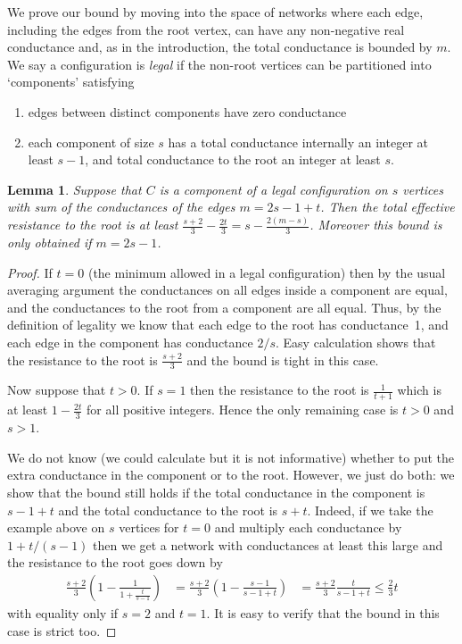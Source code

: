 \documentclass[11pt]{article}
\newtheorem{lemma}[theorem]{Lemma}
\theoremstyle{remark}
\begin{document}
We prove our bound by moving into the space of networks where each
edge, including the edges from the root vertex, can have any
non-negative real conductance and, as in the introduction, the total
conductance is bounded by $m$. We say a
configuration is \emph{legal} if the non-root vertices can be partitioned into
`components' satisfying
\begin{enumerate}
\item edges between distinct components have zero conductance
\item each component of size $s$ has a total conductance internally an
integer at least $s-1$, and total conductance to the root an integer
at least $s$.
\end{enumerate}
\begin{lemma}\label{l:qb-component}
  Suppose that $C$ is a component of a legal configuration on $s$ vertices
  with sum of the conductances of the edges $m=2s-1+t$. Then the total
  effective resistance to the root is at least
  $\frac{s+2}3-\frac{2t}{3}=s-\frac{2(m-s)}{3}$. Moreover this
  bound is only obtained if $m=2s-1$.
\end{lemma}
\begin{proof}
  If $t=0$ (the minimum allowed in a legal configuration) then by the
  usual averaging argument the conductances on all edges inside a
  component are equal, and the conductances to the root from a
  component are all equal. Thus, by the definition of legality we know
  that each edge to the root has conductance~1, and each edge in the
  component has conductance $2/s$. Easy calculation shows that the
  resistance to the root is $\frac{s+2}{3}$ and the bound is tight in
  this case.

  Now suppose that $t>0$.  If $s=1$ then the resistance to the root is
  $\frac{1}{t+1}$ which is at least $1-\frac{2t}{3}$ for all positive
  integers. Hence the only remaining case is $t>0$ and $s>1$. 

  We do not know (we could calculate but it is not informative)
  whether to put the extra conductance in the component or to the
  root. However, we just do both: we show that the bound still holds
  if the total conductance in the component is $s-1+t$ and the total
  conductance to the root is $s+t$. Indeed, if we take the example
  above on $s$ vertices for $t=0$ and multiply each conductance by
  $1+t/(s-1)$ then we get a network with conductances at least this
  large and the resistance to the root goes down by
  \begin{align*}
    \frac{s+2}{3}\left(1-\frac{1}{1+\frac{t}{s-1}}\right) 
    &=\frac{s+2}{3}\left(1-\frac{s-1}{s-1+t}\right)
    &=\frac{s+2}{3}\frac{t}{s-1+t}
    \le \frac{2}{3}t
  \end{align*}
  with equality only if $s=2$ and $t=1$. It is easy to verify that the
  bound in this case is strict too.
\end{proof}
\end{document}
